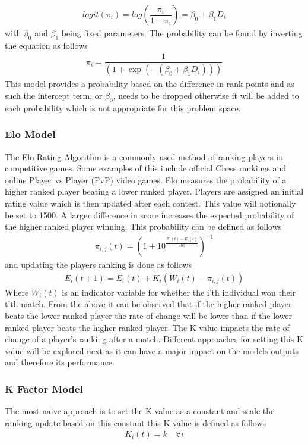 \documentclass[12pt,a4paper]{article}
\begin{document}
\begin{gather}
  logit(\pi_i) = log(\dfrac{\pi_i}{1-\pi_i}) = \beta_0 + \beta_1 D_i
\end{gather}
with $\beta_0$ and $\beta_1$ being fixed parameters.
The probability can be found by inverting the equation as follows
\begin{gather}
  \pi_i = \dfrac{1}{(1+\exp(-(\beta_0 + \beta_1 D_i)))}
\end{gather}
This model provides a probability based on the difference in rank points and as such the
intercept term, or $\beta_0$, needs to be dropped otherwise it will be added to each
probability which is not appropriate for this problem space.
\subsubsection{Elo Model}
The Elo Rating Algorithm is a commonly used method of ranking players in competitive
games. Some examples of this include official Chess rankings and online Player vs Player (PvP)
video games. Elo measures the probability of a higher ranked player beating a
lower ranked player. Players are assigned an initial rating value which is then updated after each contest.
This value will notionally be set to 1500. A larger difference in score increases the expected probability
of the higher ranked player winning. This probability can be defined as follows
\begin{gather}
  \pi_{i,j}(t) = (1 + 10^{\tfrac{E_j(t)-E_i(t)}{400}})^{-1}
\end{gather}
and updating the players ranking is done as follows
\begin{gather}
  E_i(t+1) = E_i(t) +K_i(W_i(t)-\pi_{i,j}(t))
\end{gather}
Where $W_i(t)$ is an indicator variable for whether the i'th individual won their
t'th match. From the above it can be observed that if the higher ranked player
beats the lower ranked player the rate of change will be lower than if the lower
ranked player beats the higher ranked player.
The K value impacts the rate of change of a player's ranking after a match. Different
approaches for setting this K value will be explored next as it can have a major
impact on the models outputs and therefore its performance.

\subsubsection{K Factor Model}
The most naive approach is to set the K value as a constant and scale the ranking
update based on this constant this K value is defined as follows
\begin{gather}
  K_i(t) = k \quad \forall i
\end{gather}
\end{document}
